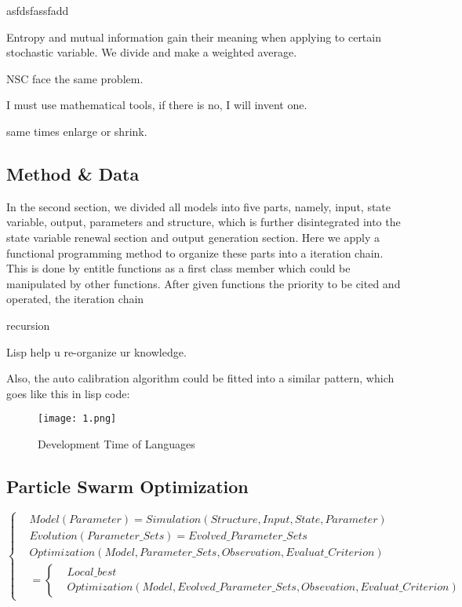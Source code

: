  asfdsfassfadd

{}
 
Entropy and mutual information gain their meaning when applying to certain stochastic variable. 
We divide and make a weighted average.

NSC face the same problem\cite{}.

I must use mathematical tools, if there is no, I will invent one.

same times enlarge or shrink.

\newpage
\begin{center}
\section{Method \& Data}
\end{center}

In the second section, we divided all models into five parts, namely, input, state variable, output, parameters and structure, which is further disintegrated into the state variable renewal section and output generation section. Here we apply a functional programming method to organize these parts into a iteration chain. This is done by entitle functions as a first class member  which could be manipulated by other functions. After given functions the priority to be cited and operated, the iteration chain 

recursion
 
Lisp help u re-organize ur knowledge.


Also, the auto calibration algorithm could be fitted into a similar pattern, which goes like this in lisp code:

 

\begin{figure}[htbp]
\centering
\texttt{[image: 1.png]}
\caption{Development Time of Languages} \label{fig:graph}
\end{figure}




\subsection{Particle Swarm Optimization}
\begin{equation*}
\left\{
\begin{aligned}
   &Model(Parameter)=Simulation(Structure,Input,State,Parameter)\\
   &Evolution(Parameter\_Sets)=Evolved\_Parameter\_Sets \\
   &Optimization (Model,Parameter\_Sets,Observation,Evaluat\_Criterion)\\&=\left\{\begin{aligned}&Local\_best\\&Optimization(Model,Evolved\_Parameter\_Sets,Obsevation,Evaluat\_Criterion)\end{aligned}\right.
\end{aligned}
\right.
\end{equation*}
 


